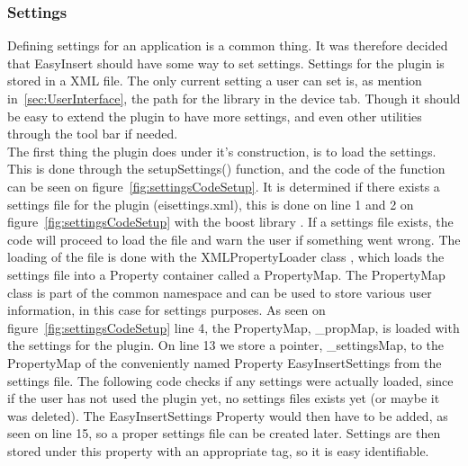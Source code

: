 \subsubsection{Settings}
\label{sec:Settings}
Defining settings for an application is a common thing. It was therefore decided that EasyInsert should have some way to set settings. Settings for the plugin is stored in a XML file. The only current setting a user can set is, as mention in~\ref{sec:UserInterface}, the path for the library in the device tab. Though it should be easy to extend the plugin to have more settings, and even other utilities through the tool bar if needed.\\

The first thing the plugin does under it's construction, is to load the settings. This is done through the setupSettings() function, and the code of the function can be seen on figure~\ref{fig:settingsCodeSetup}. It is determined if there exists a settings file for the plugin (eisettings.xml), this is done on line 1 and 2 on figure~\ref{fig:settingsCodeSetup} with the boost library \cite{BoostPathSettings}. If a settings file exists, the code will proceed to load the file and warn the user if something went wrong. The loading of the file is done with the XMLPropertyLoader class \cite{XMLPropertyLoader}, which loads the settings file into a Property container called a PropertyMap. The PropertyMap class is part of the common namespace and can be used to store various user information, in this case for settings purposes. As seen on figure~\ref{fig:settingsCodeSetup} line 4, the PropertyMap, \_propMap, is loaded with the settings for the plugin. On line 13 we store a pointer, \_settingsMap, to the PropertyMap of the conveniently named Property EasyInsertSettings from the settings file. The following code checks if any settings were actually loaded, since if the user has not used the plugin yet, no settings files exists yet (or maybe it was deleted). The EasyInsertSettings Property would then have to be added, as seen on line 15, so a proper settings file can be created later. Settings are then stored under this property with an appropriate tag, so it is easy identifiable.

